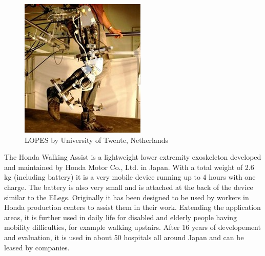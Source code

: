 \documentclass[letterpaper, 10 pt, conference]{ieeeconf}  %
\begin{document}

\begin{figure}[H]
  \centering
    \includegraphics[scale=1.1]{img/lopes}
  \caption{LOPES by University of Twente, Netherlands}
\end{figure}


The Honda Walking Assist is a lightweight lower extremity exoskeleton developed and maintained by Honda Motor Co., Ltd. in Japan.
With a total weight of 2.6 kg (including battery) it is a very mobile device running up to 4 hours with one charge.
The battery is also very small and is attached at the back of the device similar to the ELegs. Originally it has been
designed to be used by workers in Honda production centers to assist them in their work. Extending the application areas,
it is further used in daily life for disabled and elderly people having mobility difficulties, for example walking upstairs.
After 16 years of developement and evaluation, it is used in about 50 hospitals all around Japan and can be leased
by companies.

\end{document}
